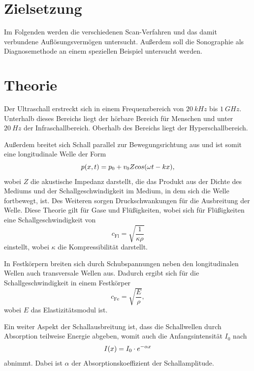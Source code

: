 \section{Zielsetzung}
Im Folgenden werden die verschiedenen Scan-Verfahren und das damit verbundene Auflösungsvermögen untersucht.
Außerdem soll die Sonographie als Diagnosemethode an einem speziellen Beispiel untersucht werden.

\section{Theorie}
Der Ultraschall erstreckt sich in einem Frequenzbereich von $\SI{20}{kHz}$ bis $\SI{1}{GHz}$.
Unterhalb dieses Bereichs liegt der hörbare Bereich für Menschen und unter $\SI{20}{Hz}$ der Infraschallbereich.
Oberhalb des Bereichs liegt der Hyperschallbereich.

Au\ss{}erdem breitet sich Schall parallel zur Bewegungsrichtung aus und ist somit eine longitudinale Welle der Form
\begin{equation}
    p(x,t) = p_0 + v_0 Z cos(\omega t - kx), \notag
\end{equation}
wobei $Z$ die akustische Impedanz darstellt, die das Produkt aus der Dichte des Mediums und der Schallgeschwindigkeit im Medium, in dem sich die Welle fortbewegt, ist.
Des Weiteren sorgen Druckschwankungen für die Ausbreitung der Welle.
Diese Theorie gilt für Gase und Flü\ss{}igkeiten, wobei sich für Flü\ss{}igkeiten eine Schallgeschwindigkeit von
\begin{equation}
    \label{eq:1}
    c_\text{Fl} = \sqrt{\frac{1}{\kappa \rho}}
\end{equation}
einstellt, wobei $\kappa$ die Kompressibilität darstellt.

In Festkörpern breiten sich durch Schubspannungen neben den longitudinalen Wellen auch transversale Wellen aus.
Dadurch ergibt sich für die Schallgeschwindigkeit in einem Festkörper
\begin{equation}
    \label{eq:2}
    c_\text{Fe} = \sqrt{\frac{E}{\rho}},
\end{equation}
wobei $E$ das Elastizitätsmodul ist.

Ein weiter Aspekt der Schallausbreitung ist, dass die Schallwellen durch Absorption teilweise Energie abgeben, womit auch die Anfangsintensität $I_0$ nach
\begin{equation}
    I (x) = I_0 \cdot e^{- \alpha x}  \notag
\end{equation}
abnimmt.
Dabei ist $\alpha$ der Absorptionskoeffizient der Schallamplitude.

